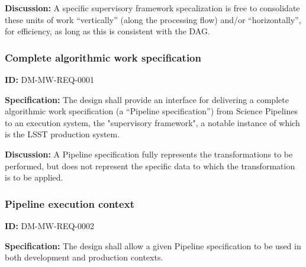 \documentclass[SE,toc,lsstdraft]{lsstdoc}
\begin{document}
\textbf{Discussion:}
A specific supervisory framework specalization is free to consolidate these units of work “vertically” (along the processing flow) and/or “horizontally”, for efficiency, as long as this is consistent with the DAG.




\subsubsection{Complete algorithmic work specification}

\label{DM-MW-REQ-0001}
\textbf{ID:} DM-MW-REQ-0001

\textbf{Specification:}
The design shall provide an interface for delivering a complete algorithmic work specification (a “Pipeline specification”) from Science Pipelines to an execution system, the "supervisory framework", a notable instance of which is the LSST production system.


\textbf{Discussion:} A Pipeline specification fully represents the transformations to be performed, but does not represent the specific data to which the transformation is to be applied.







\subsubsection{Pipeline execution context}

\label{DM-MW-REQ-0002}
\textbf{ID:} DM-MW-REQ-0002

\textbf{Specification:}
The design shall allow a given Pipeline specification to be used in both development and production contexts.








\end{document}

